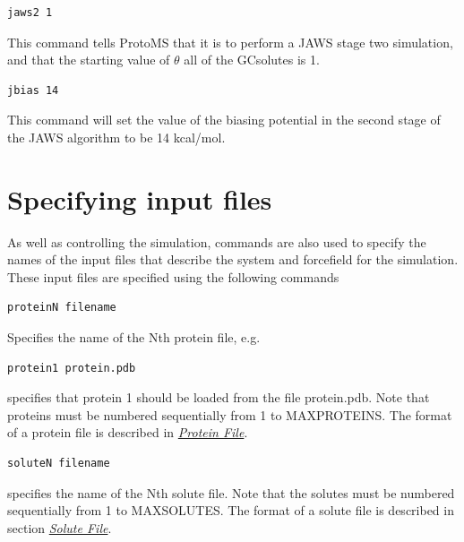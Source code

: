 \documentclass[letterpaper,10pt,english]{sphinxmanual}
\begin{document}
\begin{Verbatim}[commandchars=\\\{\}]
jaws2 1
\end{Verbatim}

This command tells ProtoMS that it is to perform a JAWS stage two simulation, and that the starting value of \(\theta\) all of the GCsolutes is 1.

\begin{Verbatim}[commandchars=\\\{\}]
jbias 14
\end{Verbatim}

This command will set the value of the biasing potential in the second stage of the JAWS algorithm to be 14 kcal/mol.


\section{Specifying input files}
\label{protoms:specifying-input-files}\label{protoms:incmd}
As well as controlling the simulation, commands are also used to specify the names of the input files that describe the system and forcefield for the simulation. These input files are specified using the following commands

\begin{Verbatim}[commandchars=\\\{\}]
proteinN filename
\end{Verbatim}

Specifies the name of the Nth protein file, e.g.

\begin{Verbatim}[commandchars=\\\{\}]
protein1 protein.pdb
\end{Verbatim}

specifies that protein 1 should be loaded from the file protein.pdb. Note that proteins must be numbered sequentially from 1 to MAXPROTEINS. The format of a protein file is described in {\hyperref[protoms:protpdb]{\emph{Protein File}}}.

\begin{Verbatim}[commandchars=\\\{\}]
soluteN filename
\end{Verbatim}

specifies the name of the Nth solute file. Note that the solutes must be numbered sequentially from 1 to MAXSOLUTES. The format of a solute file is described in section {\hyperref[protoms:solpdb]{\emph{Solute File}}}.
\end{document}
